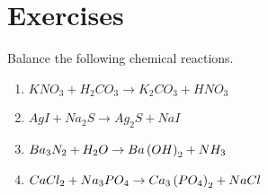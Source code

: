 \section*{Exercises}

\begin{enumialphparenastyle}

\begin{ex}
 Balance the following chemical reactions. 

\begin{enumerate}
\item $KNO_{3}+H_{2}CO_{3}\rightarrow K_{2}CO_{3}+HNO_{3}$

\item $AgI+Na_{2}S\rightarrow Ag_{2}S+NaI$

\item $Ba_{3}N_{2}+H_{2}O\rightarrow Ba\left(OH\right) _{2}+NH_{3}$

\item $CaCl_{2}+Na_{3}PO_{4}\rightarrow Ca_{3}\left(PO_{4}\right) _{2}+NaCl$
\end{enumerate}
\end{ex}

\end{enumialphparenastyle}
